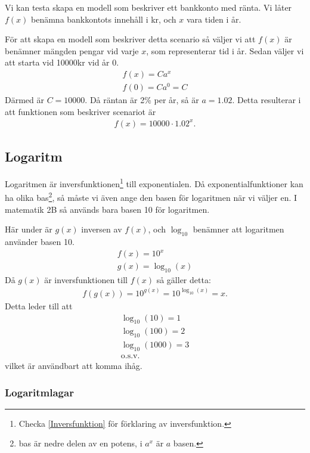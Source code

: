 Vi kan testa skapa en modell som beskriver ett bankkonto med ränta. Vi låter $f(x)$ benämna bankkontots innehåll i kr, och $x$ vara tiden i år.

För att skapa en modell som beskriver detta scenario så väljer vi att $f(x)$ är benämner mängden pengar vid varje $x$, som representerar tid i år. Sedan väljer vi att starta vid 10000kr vid år 0.
\begin{align}
	f(x)=Ca^x \\
	f(0)=Ca^0 = C
\end{align}
Därmed är $C = 10000$. Då räntan är 2\% per år, så är $a=1.02$. Detta resulterar i att funktionen som beskriver scenariot är
\begin{align}
	f(x)=10000\cdot1.02^x.
\end{align}

\newpage
\subsection{Logaritm}

Logaritmen är inversfunktionen\footnote{Checka \ref{Inversfunktion} för förklaring av inversfunktion.} till exponentialen. Då exponentialfunktioner kan ha olika bas\footnote{bas är nedre delen av en potens, i $a^x$ är $a$ basen.}, så måste vi även ange den basen för logaritmen när vi väljer en. I matematik 2B så används bara basen 10 för logaritmen.

Här under är $g(x)$ inversen av $f(x)$, och $\log_{10}$ benämner att logaritmen använder basen 10.
\begin{align}
	f(x) = 10^x \\
	g(x) = \log_{10}(x)
\end{align}
Då $g(x)$ är inversfunktionen till $f(x)$ så gäller detta:
\begin{align}
	f(g(x)) = 10^{g(x)} = 10^{\log_{10}(x)} = x.
\end{align}
Detta leder till att
\begin{align}
	\log_{10}(10) = 1 \\
	\log_{10}(100) = 2 \\
	\log_{10}(1000) = 3 \\
	\text{o.s.v.}
\end{align}
vilket är användbart att komma ihåg.

\newpage
\subsubsection{Logaritmlagar}

